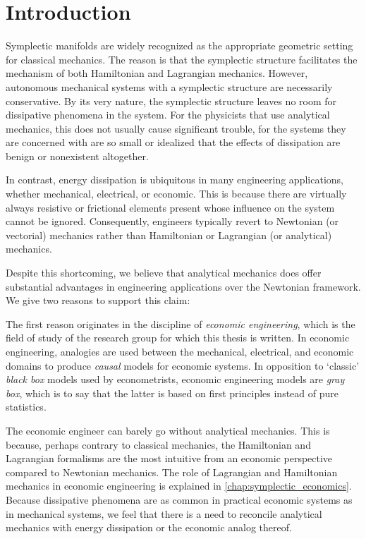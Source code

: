 \chapter{Introduction}
\label{chap:intro}

Symplectic manifolds are widely recognized as the appropriate geometric setting for classical mechanics. The reason is that the symplectic structure facilitates the mechanism of both Hamiltonian and Lagrangian mechanics. However, autonomous mechanical systems with a symplectic structure are necessarily conservative. By its very nature, the symplectic structure leaves no room for dissipative phenomena in the system. For the physicists that use analytical mechanics, this does not usually cause significant trouble, for the systems they are concerned with are so small or idealized that the effects of dissipation are benign or nonexistent altogether.

In contrast, energy dissipation is ubiquitous in many engineering applications, whether mechanical, electrical, or economic. This is because there are virtually always resistive or frictional elements present whose influence on the system cannot be ignored. Consequently, engineers typically revert to Newtonian (or vectorial) mechanics rather than Hamiltonian or Lagrangian (or analytical) mechanics.

Despite this shortcoming, we believe that analytical mechanics does offer substantial advantages in engineering applications over the Newtonian framework. We give two reasons to support this claim:

The first reason originates in the discipline of \emph{economic engineering}, which is the field of study of the research group for which this thesis is written. In economic engineering, analogies are used between the mechanical, electrical, and economic domains to produce \emph{causal} models for economic systems. In opposition to `classic' \emph{black box} models used by econometrists, economic engineering models are \emph{gray box}, which is to say that the latter is based on first principles instead of pure statistics. 

The economic engineer can barely go without analytical mechanics. This is because, perhaps contrary to classical mechanics, the Hamiltonian and Lagrangian formalisms are the most intuitive from an economic perspective compared to Newtonian mechanics. The role of Lagrangian and Hamiltonian mechanics in economic engineering is explained in \cref{chap:symplectic_economics}. 
Because dissipative phenomena are as common in practical economic systems as in mechanical systems, we feel that there is a need to reconcile analytical mechanics with energy dissipation or the economic analog thereof.

